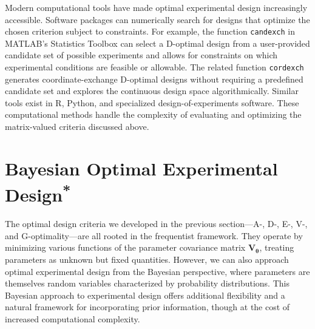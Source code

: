 Modern computational tools have made optimal experimental design increasingly accessible. Software packages can numerically search for designs that optimize the chosen criterion subject to constraints. For example, the function \texttt{candexch} in MATLAB's Statistics Toolbox can select a D-optimal design from a user-provided candidate set of possible experiments and allows for constraints on which experimental conditions are feasible or allowable. The related function \texttt{cordexch} generates coordinate-exchange D-optimal designs without requiring a predefined candidate set and explores the continuous design space algorithmically. Similar tools exist in R, Python, and specialized design-of-experiments software. These computational methods handle the complexity of evaluating and optimizing the matrix-valued criteria discussed above.

\section{\texorpdfstring{Bayesian Optimal Experimental Design\textsuperscript{*}}{Bayesian Optimal Experimental Design}}

The optimal design criteria we developed in the previous section---A-, D-, E-, V-, and G-optimality---are all rooted in the frequentist framework. They operate by minimizing various functions of the parameter covariance matrix $\mathbf{V}_{\boldsymbol{\theta}}$, treating parameters as unknown but fixed quantities. However, we can also approach optimal experimental design from the Bayesian perspective, where parameters are themselves random variables characterized by probability distributions. This Bayesian approach to experimental design offers additional flexibility and a natural framework for incorporating prior information, though at the cost of increased computational complexity.

